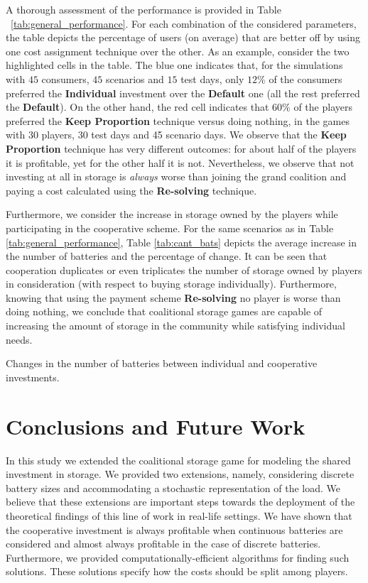 \documentclass[sigconf, table]{acmart}
\begin{document}
A thorough assessment of the performance is provided in Table ~\ref{tab:general_performance}. For each combination of the considered parameters, the table depicts the percentage of users (on average) that are better off by using one cost assignment technique over the other.
As an example, consider the two highlighted cells in the table. The blue one indicates that, for the simulations with $45$ consumers, $45$ scenarios and $15$ test days, only $12\%$ of the consumers preferred the \textbf{Individual} investment over the \textbf{Default} one (all the rest preferred the \textbf{Default}). On the other hand, the red cell indicates that $60\%$ of the players preferred the \textbf{Keep Proportion} technique versus doing nothing, in the games with $30$ players, 30 test days and 45 scenario days.
We observe that the \textbf{Keep Proportion} technique has very different outcomes: for about half of the players it is profitable, yet for the other half it is not.  Nevertheless, we observe that not investing at all in storage is \emph{always} worse than joining the grand coalition and paying a cost calculated using the \textbf{Re-solving} technique.



Furthermore, we consider the increase in storage owned by the players while participating in the cooperative scheme. For the same scenarios as in Table \ref{tab:general_performance}, Table \ref{tab:cant_bats} depicts the average increase in the number of batteries and the percentage of change. It can be seen that cooperation duplicates or even triplicates the number of storage owned by players in consideration (with respect to buying storage individually). Furthermore, knowing that using the payment scheme \textbf{Re-solving} no player is worse than doing nothing, we conclude that coalitional storage games are capable of increasing the amount of storage in the community while satisfying individual needs.

\begin{table}
  
  \caption{Changes in the number of batteries between individual and cooperative investments.}
  \label{tab:cant_bats}
\end{table}


\section{Conclusions and Future Work}

In this study we extended the coalitional storage game for modeling the shared investment in storage. We provided two extensions, namely, considering discrete battery sizes and accommodating a stochastic representation of the load. We believe that these extensions are important steps towards the deployment of the theoretical findings of this line of work in real-life settings.
We have shown that the cooperative investment is always profitable when continuous batteries are considered and almost always profitable in the case of discrete batteries.
Furthermore, we provided computationally-efficient algorithms for finding such solutions. These solutions specify how the costs should be split among players.
\end{document}

